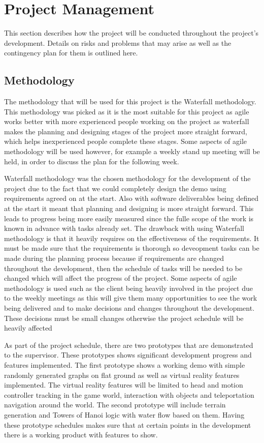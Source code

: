 \chapter{Project Management}
\label{chapter4}

This section describes how the project will be conducted throughout the project's development. Details on risks and problems that may arise as well as the contingency plan for them is outlined here.

\section{Methodology}
The methodology that will be used for this project is the Waterfall methodology. This methodology was picked as it is the most suitable for this project as agile works better with more experienced people working on the project as waterfall makes the planning and designing stages of the project more straight forward, which helps inexperienced people complete these stages. Some aspects of agile methodology will be used however, for example a weekly stand up meeting will be held, in order to discuss the plan for the following week. 
\newline
\par
Waterfall methodology was the chosen methodology for the development of the project due to the fact that we could completely design the demo using requirements agreed on at the start. Also with software deliverables being defined at the start it meant that planning and designing is more straight forward. This leads to progress being more easily measured since the fulle scope of the work is known in advance with tasks already set. The drawback with using Waterfall methodology is that it heavily requires on the effectiveness of the requirements. It must be made sure that the requirements is thorough so deveopment tasks can be made during the planning process because if requirements are changed throughout the development, then the schedule of tasks will be needed to be changed which will affect the progress of the project. Some aspects of agile methodology is used such as the client being heavily involved in the project due to the weekly meetings as this will give them many opportunities to see the work being delivered and to make decisions and changes throughout the development. These decisions must be small changes otherwise the project schedule will be heavily affected
\newline
\par
As part of the project schedule, there are two prototypes that are demonstrated to the supervisor. These prototypes shows significant development progress and features implemented. The first prototype shows a working demo with simple randomly generated graphs on flat ground as well as virtual reality features implemented. The virtual reality features will be limited to head and motion controller tracking in the game world, interaction with objects and teleportation navigation around the world. The second prototype will include terrain generation and Towers of Hanoi logic with water flow based on them. Having these prototype schedules makes sure that at certain points in the development there is a working product with features to show.
